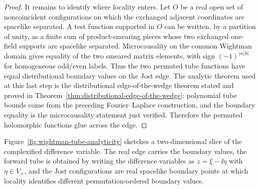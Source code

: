 \begin{proof}
It remains to identify where locality enters.  Let \(O\) be a real open set
of noncoincident configurations on which the exchanged adjacent coordinates
are spacelike separated.  A test function supported in \(O\) can be written,
by a partition of unity, as a finite sum of product-smearing pieces whose two
exchanged one-field supports are spacelike separated.  Microcausality on the
common Wightman domain gives equality of the two smeared matrix elements,
with sign \((-1)^{|a||b|}\) for homogeneous odd/even labels.  Thus the two
permuted tube functions have equal distributional boundary values on the
Jost edge.  The analytic theorem used at this last step is the
distributional edge-of-the-wedge theorem stated and proved in
Theorem~\ref{thm:distributional-edge-of-the-wedge}: polynomial tube bounds
come from the preceding Fourier--Laplace construction, and the boundary
equality is the microcausality statement just verified.  Therefore the
permuted holomorphic functions glue across the edge.
\end{proof}

Figure~\ref{fig:wightman-tube-analyticity} sketches a two-dimensional slice of
the complexified difference variable.  The real edge carries the boundary
values, the forward tube is obtained by writing the difference variables as
\(z=\xi-\ii\eta\) with \(\eta\in V_+\), and the Jost configurations are real
spacelike boundary points at which locality identifies different
permutation-ordered boundary values.

